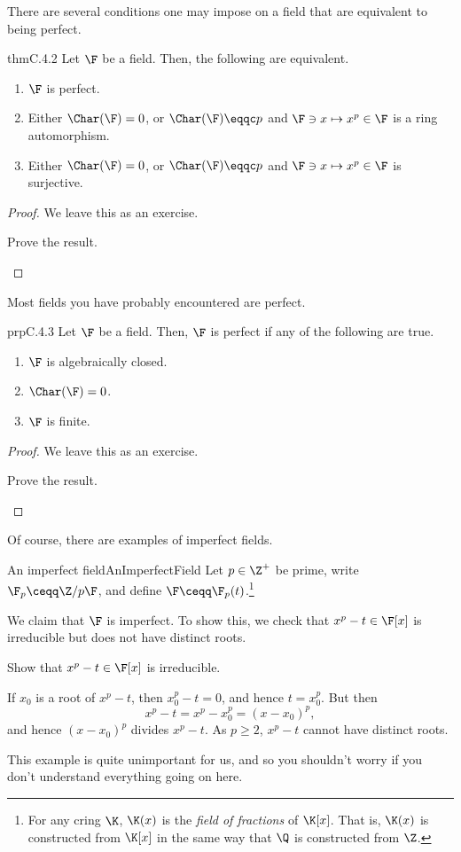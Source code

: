 There are several conditions one may impose on a field that are equivalent to being perfect.
\begin{thm}{}{thmC.4.2}
	Let $\F$ be a field.  Then, the following are equivalent.
	\begin{enumerate}
		\item $\F$ is perfect.
		\item Either $\Char (\F )=0$, or $\Char (\F )\eqqc p$ and $\F \ni x\mapsto x^p\in \F$ is a ring automorphism.
		\item Either $\Char (\F )=0$, or $\Char (\F )\eqqc p$ and $\F \ni x\mapsto x^p\in \F$ is surjective.
	\end{enumerate}
	\begin{proof}
		We leave this as an exercise.
		\begin{exr}[breakable=false]{}{}
			Prove the result.
		\end{exr}
	\end{proof}
\end{thm}
Most fields you have probably encountered are perfect.
\begin{prp}{}{prpC.4.3}
	Let $\F$ be a field.  Then, $\F$ is perfect if any of the following are true.
	\begin{enumerate}
		\item $\F$ is algebraically closed.
		\item $\Char (\F )=0$.
		\item $\F$ is finite.
	\end{enumerate}
	\begin{proof}
		We leave this as an exercise.
		\begin{exr}[breakable=false]{}{}
			Prove the result.
		\end{exr}
	\end{proof}
\end{prp}
Of course, there are examples of imperfect fields.
\begin{exm}{An imperfect field}{AnImperfectField}
	Let $p\in \Z ^+$ be prime, write $\F _p\ceqq \Z /p\F$, and define $\F \ceqq \F _p(t)$.\footnote{For any cring $\K$, $\K (x)$ is the \emph{field of fractions} of $\K [x]$.  That is, $\K (x)$ is constructed from $\K [x]$ in the same way that $\Q$ is constructed from $\Z$.}
	
	We claim that $\F$ is imperfect.  To show this, we check that $x^p-t\in \F [x]$ is irreducible but does not have distinct roots.
	\begin{exr}[breakable=false]{}{}
		Show that $x^p-t\in \F [x]$ is irreducible.
	\end{exr}
	If $x_0$ is a root of $x^p-t$, then $x_0^p-t=0$, and hence $t=x_0^p$.  But then
	\begin{equation}
	x^p-t=x^p-x_0^p=(x-x_0)^p,
	\end{equation}
	and hence $(x-x_0)^p$ divides $x^p-t$.  As $p\geq 2$, $x^p-t$ cannot have distinct roots.
	\begin{rmk}
		This example is quite unimportant for us, and so you shouldn't worry if you don't understand everything going on here.
	\end{rmk}
\end{exm}

